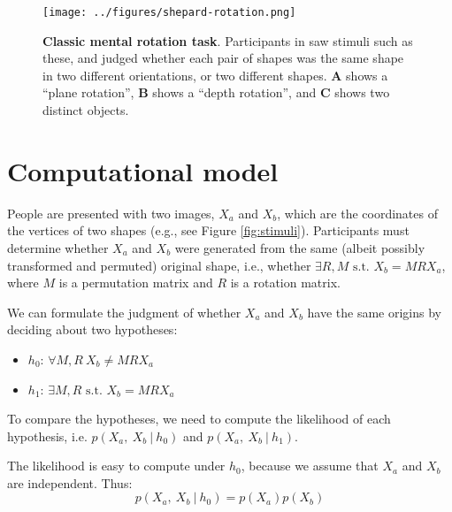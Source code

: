 \documentclass{article} %
\begin{document}

\begin{figure}[t]
  \centering
  \texttt{[image: ../figures/shepard-rotation.png]}
  \caption{\textbf{Classic mental rotation task}. Participants in
    \cite{Shepard1971} saw stimuli such as these, and judged whether
    each pair of shapes was the same shape in two different
    orientations, or two different shapes. \textbf{A} shows a ``plane
    rotation'', \textbf{B} shows a ``depth rotation'', and \textbf{C}
    shows two distinct objects.}
  \label{fig:mental-rotation}
\end{figure}

\section{Computational model}

People are presented with two images, $X_a$ and $X_b$, which are the
coordinates of the vertices of two shapes (e.g., see Figure
\ref{fig:stimuli}). Participants must determine whether $X_a$ and
$X_b$ were generated from the same (albeit possibly transformed and
permuted) original shape, i.e., whether $\exists R,M\textrm{ s.t. }
X_b=MRX_a$, where $M$ is a permutation matrix and $R$ is a rotation
matrix.

We can formulate the judgment of whether $X_a$ and $X_b$ have the same
origins by deciding about two hypotheses:

\begin{itemize}
\itemsep1pt\parskip0pt
\item
  $h_0$: $\forall M,R\ X_b\neq MRX_a$
\item
  $h_1$: $\exists M,R\textrm{ s.t. } X_b=MRX_a$
\end{itemize}

To compare the hypotheses, we need to compute the likelihood of each
hypothesis, i.e. $p(X_a,\ X_b\ \vert \ h_0)$ and $p(X_a,\ X_b\ \vert \
h_1)$.

The likelihood is easy to compute under $h_0$, because we assume that
$X_a$ and $X_b$ are independent. Thus:
\begin{equation}
  p(X_a,\ X_b\ \vert \ h_0)=p(X_a)p(X_b)
  \label{eq:lh-h0}
\end{equation}
\end{document}
